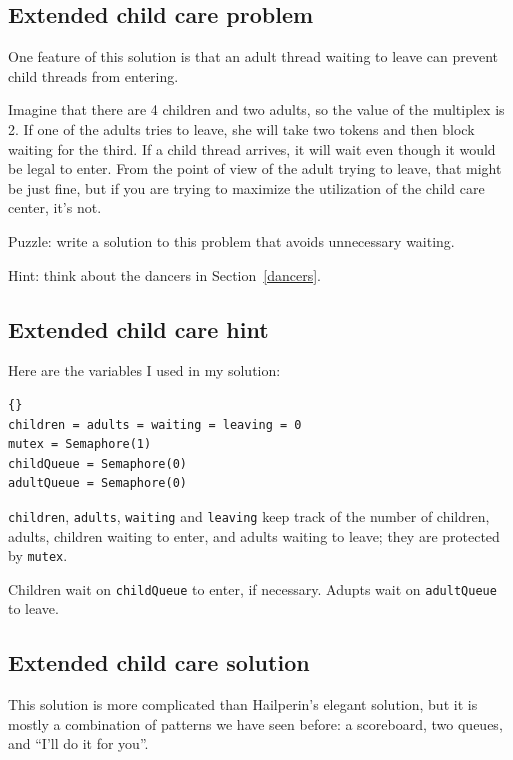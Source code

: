 \documentclass{book}
\newcommand{\clearemptydoublepage}{\newpage\cleardoublepage}
\begin{document}
\subsection {Extended child care problem}

One feature of this solution is that an adult thread waiting to leave
can prevent child threads from entering.

Imagine that there are 4 children and two adults, so the value of the
multiplex is 2.  If one of the adults tries to leave, she will take
two tokens and then block waiting for the third.  If a child thread
arrives, it will wait even though it would be legal to enter.
From the point of view of the adult trying to leave, that might
be just fine, but if you are trying to maximize the utilization
of the child care center, it's not.

Puzzle: write a solution to this problem that avoids unnecessary
waiting.

Hint: think about the dancers in Section~\ref{dancers}.



\clearemptydoublepage
\subsection {Extended child care hint}

Here are the variables I used in my solution:

\begin{lstlisting}[caption={Extended child care hint}]{}
children = adults = waiting = leaving = 0
mutex = Semaphore(1)
childQueue = Semaphore(0)
adultQueue = Semaphore(0)
\end{lstlisting}

{\tt children}, {\tt adults}, {\tt waiting} and {\tt leaving}
keep track of the number of children, adults, children waiting
to enter, and adults waiting to leave; they are protected by
{\tt mutex}.

Children wait on {\tt childQueue} to enter, if necessary.
Adupts wait on {\tt adultQueue} to leave.



\clearemptydoublepage
\subsection {Extended child care solution}

This solution is more complicated than
Hailperin's elegant solution, but it is mostly a combination
of patterns we have seen before: a scoreboard, two queues,
and ``I'll do it for you''.
\end{document}
